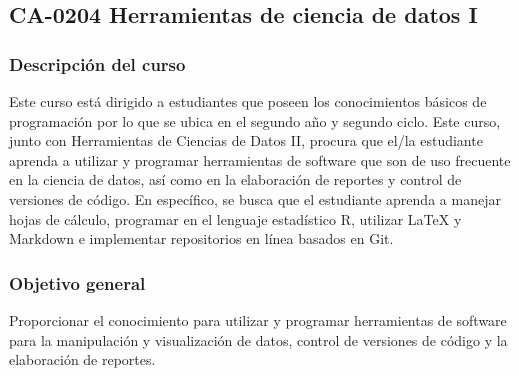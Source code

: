 \newpage
\subsection*{CA-0204 Herramientas de ciencia de datos I}

\hypertarget{CA0204}{}
\begin{refsection}
\begin{table}[H]
\end{table}

\subsubsection*{Descripción del curso}

Este curso está dirigido a estudiantes que poseen los conocimientos básicos de programación por lo que se ubica en el segundo año y segundo ciclo. Este curso, junto con Herramientas de Ciencias de Datos II, procura que el/la estudiante aprenda a utilizar y programar herramientas de software que son de uso frecuente en la ciencia de datos, así como en la elaboración de reportes y control de versiones de código. En específico, se busca que el estudiante aprenda a manejar hojas de cálculo, programar en el lenguaje estadístico R, utilizar \LaTeX{} y Markdown e implementar repositorios en línea basados en Git.

\subsubsection*{Objetivo general}

Proporcionar el conocimiento para utilizar y programar herramientas de software para la manipulación y visualización de datos, control de versiones de código y la elaboración de reportes.


\end{refsection}
